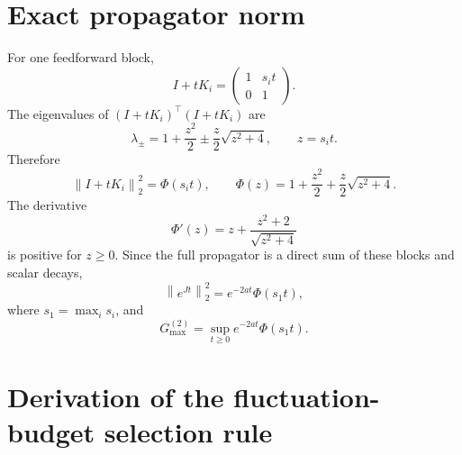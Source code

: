 \documentclass[
  aps,prl,preprint,notitlepage,superscriptaddress,nofootinbib,longbibliography,
  amsmath,amssymb
]{revtex4-2}
\newcommand{\Gmax}{G_{\max}^{(2)}}
\newcommand{\opnorm}[1]{\left\lVert #1\right\rVert_2}
\begin{document}
\section{Exact propagator norm}
\label{sec:s-gain}

For one feedforward block,
\begin{equation}
I+tK_i=
\begin{pmatrix}
1&s_it\\
0&1
\end{pmatrix}.
\end{equation}
The eigenvalues of
$(I+tK_i)^\top(I+tK_i)$ are
\begin{equation}
\lambda_{\pm}
=1+\frac{z^2}{2}\pm\frac{z}{2}\sqrt{z^2+4},
\qquad z=s_it.
\end{equation}
Therefore
\begin{equation}
\opnorm{I+tK_i}^2
=\Phi(s_it),\qquad
\Phi(z)=1+\frac{z^2}{2}
+\frac{z}{2}\sqrt{z^2+4}.
\label{eq:s-phi}
\end{equation}
The derivative
\begin{equation}
\Phi'(z)=z+\frac{z^2+2}{\sqrt{z^2+4}}
\end{equation}
is positive for $z\ge0$. Since the full propagator is a direct sum of these
blocks and scalar decays,
\begin{equation}
\opnorm{e^{Jt}}^2=e^{-2at}\Phi(s_1t),
\end{equation}
where $s_1=\max_i s_i$, and
\begin{equation}
\Gmax=\sup_{t\ge0}e^{-2at}\Phi(s_1t).
\label{eq:s-gainexact}
\end{equation}

\section{Derivation of the fluctuation-budget selection rule}
\label{sec:s-theorem}
\end{document}
